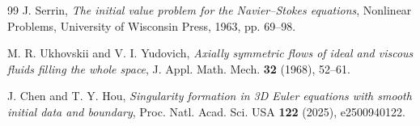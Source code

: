 \documentclass[11pt]{amsart}
\begin{document}
\begin{thebibliography}{99}
J. Serrin,
\emph{The initial value problem for the Navier--Stokes equations},
Nonlinear Problems, University of Wisconsin Press, 1963, pp. 69--98.

M. R. Ukhovskii and V. I. Yudovich,
\emph{Axially symmetric flows of ideal and viscous fluids filling the whole space},
J. Appl. Math. Mech. \textbf{32} (1968), 52--61.

J. Chen and T. Y. Hou,
\emph{Singularity formation in 3D Euler equations with smooth initial data and boundary},
Proc. Natl. Acad. Sci. USA \textbf{122} (2025), e2500940122.

\end{thebibliography}
\end{document}
